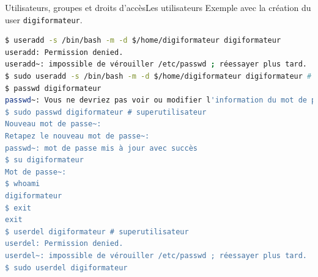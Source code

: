 \documentclass{beamer}
\begin{document}
    \begin{frame}[fragile]{Utilisateurs, groupes et droits d'accès}{Les utilisateurs}
        Exemple avec la création du user \lstinline{digiformateur}.
        \begin{lstlisting}[language=bash]
$ useradd -s /bin/bash -m -d $/home/digiformateur digiformateur
useradd: Permission denied.
useradd~: impossible de vérouiller /etc/passwd ; réessayer plus tard.
$ sudo useradd -s /bin/bash -m -d $/home/digiformateur digiformateur # sudo
$ passwd digiformateur
passwd~: Vous ne devriez pas voir ou modifier l'information du mot de passe pour digiformateur.
$ sudo passwd digiformateur # superutilisateur
Nouveau mot de passe~: 
Retapez le nouveau mot de passe~: 
passwd~: mot de passe mis à jour avec succès
$ su digiformateur
Mot de passe~: 
$ whoami
digiformateur
$ exit
exit
$ userdel digiformateur # superutilisateur
userdel: Permission denied.
userdel~: impossible de vérouiller /etc/passwd ; réessayer plus tard.
$ sudo userdel digiformateur
        \end{lstlisting}
    \end{frame}
\end{document}
